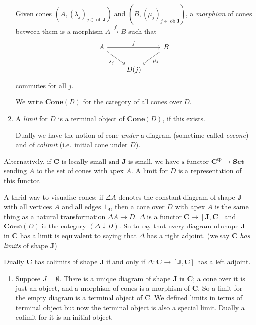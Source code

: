 \documentclass[a4paper]{article}
\renewcommand{\c}[1]{\mathbf{#1}}
\DeclareMathOperator{\ob}{ob}
\newcommand{\Set}{{\c{Set}}}
\newcommand{\Cone}{{\c{Cone}}}
\begin{document}
\begin{definition}
\begin{enumerate}
    Given cones \((A, (\lambda_j)_{j \in \ob \c J})\) and \((B, (\mu_j)_{j \in \ob \c J})\), a \emph{morphism} of cones between them is a morphism \(A \xrightarrow{f} B\) such that
    \[
      \begin{tikzcd}
        A \ar[dr, "\lambda_j"'] \ar[rr, "f"] && B \ar[dl, "\mu_j"] \\
        & D(j)
      \end{tikzcd}
    \]
    commutes for all \(j\).

    We write \(\Cone(D)\) for the category of all cones over \(D\).
  \item A \emph{limit} for \(D\) is a terminal object of \(\Cone(D)\), if this exists.

    Dually we have the notion of cone \emph{under} a diagram (sometime called \emph{cocone}) and of \emph{colimit} (i.e.\ initial cone under \(D\)).
  \end{enumerate}
\end{definition}

Alternatively, if \(\c C\) is locally small and \(\c J\) is small, we have a functor \(\c C^{\text{op}} \to \Set\) sending \(A\) to the set of cones with apex \(A\). A limit for \(D\) is a representation of this functor.

A thrid way to visualise cones: if \(\Delta A\) denotes the constant diagram of shape \(\c J\) with all vertices \(A\) and all edges \(1_A\), then a cone over \(D\) with apex \(A\) is the same thing as a natural transformation \(\Delta A \to D\). \(\Delta\) is a functor \(\c C \to [\c J, \c C]\) and \(\Cone(D)\) is the category \((\Delta \downarrow D)\). So to say that every diagram of shape \(\c J\) in \(\c C\) has a limit is equivalent to saying that \(\Delta\) has a right adjoint. (we say \(\c C\) \emph{has limits} of shape \(\c J\))

Dually \(\c C\) has colimits of shape \(\c J\) if and only if \(\Delta: \c C \to [\c J, \c C]\) has a left adjoint.

\begin{eg}\leavevmode
  \begin{enumerate}
  \item Suppose \(J = \emptyset\). There is a unique diagram of shape \(\c J\) in \(\c C\); a cone over it is just an object, and a morphism of cones is a morphism of \(\c C\). So a limit for the empty diagram is a terminal object of \(\c C\). We defined limits in terms of terminal object but now the terminal object is also a special limit. Dually a colimit for it is an initial object.
  \end{enumerate}
\end{eg}



\printindex
\end{document}
